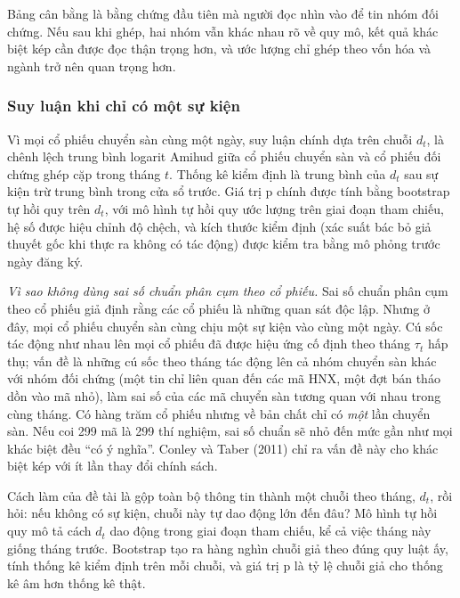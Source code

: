 Bảng cân bằng là bằng chứng đầu tiên mà người đọc nhìn vào để tin nhóm đối chứng. Nếu sau khi ghép, hai nhóm vẫn khác nhau rõ về quy mô, kết quả khác biệt kép cần được đọc thận trọng hơn, và ước lượng chỉ ghép theo vốn hóa và ngành trở nên quan trọng hơn.


\subsubsection*{Suy luận khi chỉ có một sự kiện}

Vì mọi cổ phiếu chuyển sàn cùng một ngày, suy luận chính dựa trên chuỗi $d_t$, là chênh lệch trung bình logarit Amihud giữa cổ phiếu chuyển sàn và cổ phiếu đối chứng ghép cặp trong tháng $t$. Thống kê kiểm định là trung bình của $d_t$ sau sự kiện trừ trung bình trong cửa sổ trước. Giá trị p chính được tính bằng bootstrap tự hồi quy trên $d_t$, với mô hình tự hồi quy ước lượng trên giai đoạn tham chiếu, hệ số được hiệu chỉnh độ chệch, và kích thước kiểm định (xác suất bác bỏ giả thuyết gốc khi thực ra không có tác động) được kiểm tra bằng mô phỏng trước ngày đăng ký.

\begin{vidao}
\emph{Vì sao không dùng sai số chuẩn phân cụm theo cổ phiếu.} Sai số chuẩn phân cụm theo cổ phiếu giả định rằng các cổ phiếu là những quan sát độc lập. Nhưng ở đây, mọi cổ phiếu chuyển sàn cùng chịu một sự kiện vào cùng một ngày. Cú sốc tác động như nhau lên mọi cổ phiếu đã được hiệu ứng cố định theo tháng $\tau_t$ hấp thụ; vấn đề là những cú sốc theo tháng tác động lên cả nhóm chuyển sàn khác với nhóm đối chứng (một tin chỉ liên quan đến các mã HNX, một đợt bán tháo dồn vào mã nhỏ), làm sai số của các mã chuyển sàn tương quan với nhau trong cùng tháng. Có hàng trăm cổ phiếu nhưng về bản chất chỉ có \emph{một} lần chuyển sàn. Nếu coi 299 mã là 299 thí nghiệm, sai số chuẩn sẽ nhỏ đến mức gần như mọi khác biệt đều \enquote{có ý nghĩa}. Conley và Taber (2011) chỉ ra vấn đề này cho khác biệt kép với ít lần thay đổi chính sách.

Cách làm của đề tài là gộp toàn bộ thông tin thành một chuỗi theo tháng, $d_t$, rồi hỏi: nếu không có sự kiện, chuỗi này tự dao động lớn đến đâu? Mô hình tự hồi quy mô tả cách $d_t$ dao động trong giai đoạn tham chiếu, kể cả việc tháng này giống tháng trước. Bootstrap tạo ra hàng nghìn chuỗi giả theo đúng quy luật ấy, tính thống kê kiểm định trên mỗi chuỗi, và giá trị p là tỷ lệ chuỗi giả cho thống kê âm hơn thống kê thật.
\end{vidao}

